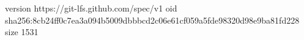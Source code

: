 version https://git-lfs.github.com/spec/v1
oid sha256:8cb24ff0c7ea3a094b5009dbbbcd2c06e61cf059a5fde98320d98e9ba81fd228
size 1531
